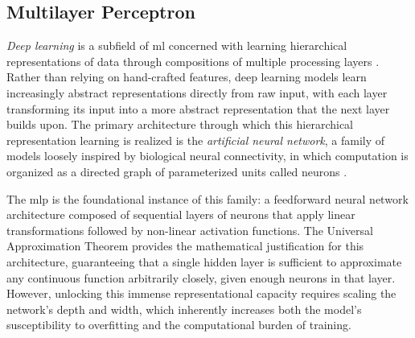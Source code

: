 \subsection{Multilayer Perceptron}
\label{sec:theoretical_mlp}

\textit{Deep learning} is a subfield of \gls{ml} concerned with learning hierarchical representations of data through compositions of multiple processing layers \parencite{lecunDeepLearning2015}. Rather than relying on hand-crafted features, deep learning models learn increasingly abstract representations directly from raw input, with each layer transforming its input into a more abstract representation that the next layer builds upon. The primary architecture through which this hierarchical representation learning is realized is the \textit{artificial neural network}, a family of models loosely inspired by biological neural connectivity, in which computation is organized as a directed graph of parameterized units called neurons \parencite{lecunDeepLearning2015}.

The \gls{mlp} is the foundational instance of this family: a feedforward neural network architecture composed of sequential layers of neurons that apply linear transformations followed by non-linear activation functions. The Universal Approximation Theorem \parencite{hornikMultilayerFeedforwardNetworks1989} provides the mathematical justification for this architecture, guaranteeing that a single hidden layer is sufficient to approximate any continuous function arbitrarily closely, given enough neurons in that layer. However, unlocking this immense representational capacity requires scaling the network's depth and width, which inherently increases both the model's susceptibility to overfitting and the computational burden of training.

